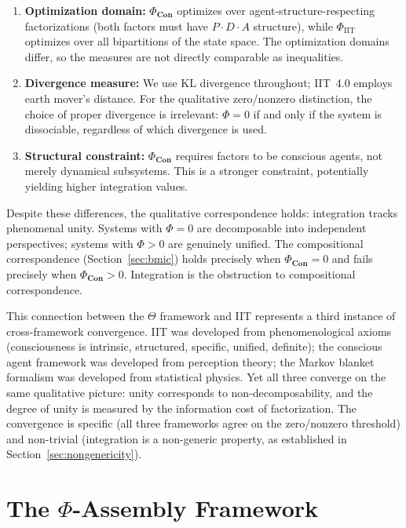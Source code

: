 \documentclass[11pt,a4paper]{article}
\theoremstyle{definition}
\theoremstyle{plain}
\theoremstyle{remark}
\newcommand{\Con}{\mathbf{Con}}
\begin{document}
\begin{enumerate}
    \item \textbf{Optimization domain:} $\Phi_{\Con}$ optimizes over agent-structure-respecting factorizations (both factors must have $P \cdot D \cdot A$ structure), while $\Phi_{\text{IIT}}$ optimizes over all bipartitions of the state space. The optimization domains differ, so the measures are not directly comparable as inequalities.

    \item \textbf{Divergence measure:} We use KL divergence throughout; IIT~4.0 employs earth mover's distance. For the qualitative zero/nonzero distinction, the choice of proper divergence is irrelevant: $\Phi = 0$ if and only if the system is dissociable, regardless of which divergence is used.

    \item \textbf{Structural constraint:} $\Phi_{\Con}$ requires factors to be conscious agents, not merely dynamical subsystems. This is a stronger constraint, potentially yielding higher integration values.
\end{enumerate}

Despite these differences, the qualitative correspondence holds: integration tracks phenomenal unity. Systems with $\Phi = 0$ are decomposable into independent perspectives; systems with $\Phi > 0$ are genuinely unified. The compositional correspondence (Section~\ref{sec:bmic}) holds precisely when $\Phi_{\Con} = 0$ and fails precisely when $\Phi_{\Con} > 0$. Integration is the obstruction to compositional correspondence.

This connection between the $\Theta$ framework and IIT represents a third instance of cross-framework convergence. IIT was developed from phenomenological axioms (consciousness is intrinsic, structured, specific, unified, definite); the conscious agent framework was developed from perception theory; the Markov blanket formalism was developed from statistical physics. Yet all three converge on the same qualitative picture: unity corresponds to non-decomposability, and the degree of unity is measured by the information cost of factorization. The convergence is specific (all three frameworks agree on the zero/nonzero threshold) and non-trivial (integration is a non-generic property, as established in Section~\ref{sec:nongenericity}).

\section{The $\Phi$-Assembly Framework}\label{sec:phi}
\end{document}
